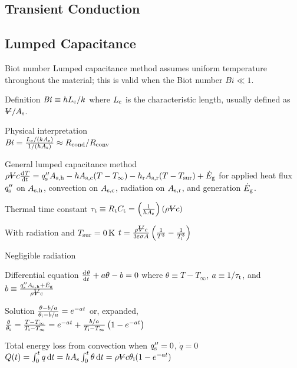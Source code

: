 \documentclass{article}
\begin{document}
\begin{multicols}{2}
\section{Transient Conduction}

\subsection{Lumped Capacitance}
\begin{description*}
\item[Biot number] Lumped capacitance method assumes uniform temperature throughout the material;
  this is valid when the Biot number \(\mathit{Bi} \ll 1\).
  \begin{description*}
  \item[Definition]
    \(\mathit{Bi} \equiv hL_{\mathrm{c}}/k\) where \(L_{\mathrm{c}}\) is the characteristic length,
    usually defined as \(\volsym / A_\mrm{s}\).
  \item[Physical interpretation]~\\
    \(\mathit{Bi} = \frac{L_{\mathrm{c}}/(kA_{\mathrm{s}})}{1/(hA_{\mathrm{s}})}
    \approx R_{\mathrm{cond}}/R_{\mathrm{conv}}\)
  \end{description*}
\item[General lumped capacitance method]
  \(\rho \volsym c \od{T}{t} \\
  = q''_\mrm{s}A_\mrm{s,h} - hA_\mrm{s,c}(T-T_\infty)
  - h_\mrm{r}A_\mrm{s,r}(T-T_\mrm{sur}) + \dot{E}_\mrm{g}\)
  for applied heat flux \(q''_{\mathrm{s}}\) on \(A_{\mathrm{s,h}}\), convection on \(A_{\mathrm{s,c}}\),
  radiation on \(A_{\mathrm{s,r}}\), and generation \(\dot{E}_{\mathrm{g}}\).
\item[Thermal time constant]
  \(\tau_\mrm{t} \equiv R_\mrm{t}C_\mrm{t}
  = \left(\frac{1}{hA_\mrm{s}}\right)(\rho\volsym{}c)\)
\item[With radiation and \(T_{\mathrm{sur}}=\SI{0}{\kelvin}\)]
  \(t = \frac{\rho\volsym{}c}{3\varepsilon\sigma A}\left(\frac{1}{T^3}-\frac{1}{T_\mrm{i}^3}\right)\)
\item[Negligible radiation]~
  \begin{description*}
  \item[Differential equation]
    \(\od{\theta}{t} + a\theta - b = 0\) where
    \(\theta \equiv T-T_\infty\),
    \(a \equiv 1/\tau_{\mathrm{t}}\), and
    \(b \equiv \frac{q''_\mrm{s}A_\mrm{s,h}+\dot{E}_\mrm{g}}{\rho\volsym{}c}\)
  \item[Solution]
    \(\frac{\theta-b/a}{\theta_{\mathrm{i}}-b/a} = e^{-at}\) or, expanded, \\
    \(\frac{\theta}{\theta_{\mathrm{i}}} = \frac{T-T_\infty}{T_{\mathrm{i}}-T_\infty}
    = e^{-at} + \frac{b/a}{T_{\mathrm{i}}-T_\infty}\left(1-e^{-at}\right)\)
  \item[Total energy loss from convection when $q''_{\mathrm{s}}=0$, $\dot{q}=0$]
    \(Q(t) = \int_0^t q \dif{t}
    = hA_\mrm{s}\int_0^t\theta\dif{t} \\
    = \rho\volsym{}c\theta_\mrm{i}(1-e^{-at})\)
  \end{description*}
\end{description*}


\end{multicols}
\end{document}
